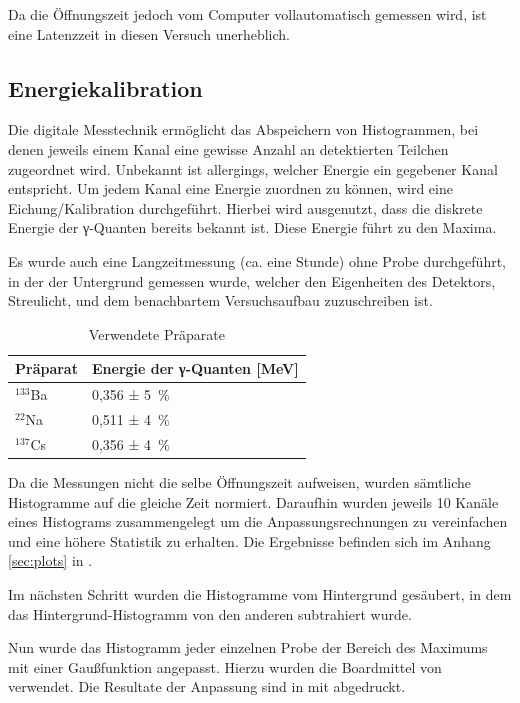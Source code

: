 Da die Öffnungszeit jedoch vom Computer vollautomatisch
gemessen wird, ist eine Latenzzeit in diesen Versuch unerheblich.

\subsection{Energiekalibration}

Die digitale Messtechnik ermöglicht das Abspeichern von Histogrammen, bei denen
jeweils einem Kanal eine gewisse Anzahl an detektierten Teilchen zugeordnet
wird. Unbekannt ist allergings, welcher Energie ein gegebener Kanal entspricht.
Um jedem Kanal eine Energie zuordnen zu können, wird eine Eichung/Kalibration
durchgeführt. Hierbei wird ausgenutzt, dass die diskrete Energie der γ-Quanten
bereits bekannt ist. Diese Energie führt zu den Maxima.

Es wurde auch eine Langzeitmessung (ca. eine Stunde)
ohne Probe durchgeführt, in der der Untergrund gemessen wurde, welcher den
Eigenheiten des Detektors, Streulicht, und dem benachbartem Versuchsaufbau
zuzuschreiben ist.

\begin{table}[htbp]
\centering
\begin{tabular*}{\columnwidth}{%
l%
l}
\toprule
{Präparat} & {Energie der γ-Quanten [\si{\mega\eV}]} \\
\midrule
$^{133}$Ba & 0,356 ± \SI{5}{\percent} \\
$^{22}$Na & 0,511 ± \SI{4}{\percent} \\
$^{137}$Cs & 0,356 ± \SI{4}{\percent} \\
\bottomrule
\end{tabular*}
\label{tab:proben}
\caption{Verwendete Präparate}
\end{table}

Da die Messungen nicht die selbe Öffnungszeit aufweisen, wurden sämtliche
Histogramme auf die gleiche Zeit normiert. Daraufhin wurden jeweils 10 Kanäle
eines Histograms zusammengelegt um die Anpassungsrechnungen zu vereinfachen und
eine höhere Statistik zu erhalten. Die Ergebnisse befinden sich im Anhang
\ref{sec:plots} in .

Im nächsten Schritt wurden die Histogramme vom Hintergrund gesäubert, in dem
das Hintergrund-Histogramm von den anderen subtrahiert wurde.

Nun wurde das Histogramm jeder einzelnen Probe der Bereich des Maximums mit einer
Gaußfunktion angepasst. Hierzu wurden die Boardmittel von \cite{root} verwendet.
Die Resultate der Anpassung sind in  mit abgedruckt.

